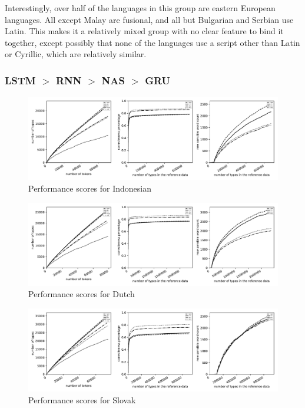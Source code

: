 \documentclass[11pt,a4paper,twoside,openright]{scrbook}
\begin{document}
Interestingly, over half of the languages in this group are eastern European languages. All except Malay are fusional, and all but Bulgarian and Serbian use Latin. This makes it a relatively mixed group with no clear feature to bind it together, except possibly that none of the languages use a script other than Latin or Cyrillic, which are relatively similar. 

\subsubsection{LSTM $>$ RNN $>$ NAS $>$ GRU}

\begin{figure}
\centering
\includegraphics[width=\textwidth]{graphs/id_all_graphs}
\caption{Performance scores for Indonesian}
\label{Figure:id_all_graphs}
\end{figure}

\begin{figure}
\centering
\includegraphics[width=\textwidth]{graphs/nl_all_graphs}
\caption{Performance scores for Dutch}
\label{Figure:nl_all_graphs}
\end{figure}

\begin{figure}
\centering
\includegraphics[width=\textwidth]{graphs/sk_all_graphs}
\caption{Performance scores for Slovak}
\label{Figure:sk_all_graphs}
\end{figure}
\end{document}
